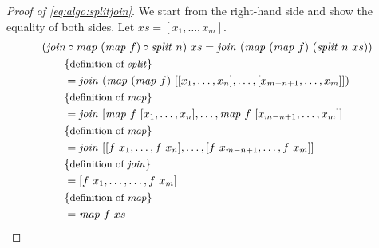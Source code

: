 \begin{proof}[Proof of \autoref{eq:algo:splitjoin}]
  We start from the right-hand side and show the equality of both sides.
  Let $xs = [x_1, \ldots, x_m]$.
  \begin{align*}
    &(\join \circ \map\ (\map\ f) \circ \splitN\ n)\ xs = \join\ (\map\ (\map\ f)\ (\splitN\ n\ xs))\\
    &\qquad \comment{definition of \splitN}\\
    &\qquad = \join\ (\map\ (\map\ f)\ [[x_1, \ldots, x_n], \ldots, [x_{m-n+1}, \ldots, x_m]])\\
    &\qquad \comment{definition of \map}\\
    &\qquad = \join\ [\map\ f\ [x_1, \ldots, x_n], \ldots, \map\ f\ [x_{m-n+1}, \ldots, x_m]]\\
    &\qquad \comment{definition of \map}\\
    &\qquad = \join\ [[f\ x_1, \ldots, f\ x_n], \ldots, [f\ x_{m-n+1}, \ldots, f\ x_m]]\\
    &\qquad \comment{definition of \join}\\
    &\qquad = [f\ x_1, \ldots, \ldots, f\ x_m]\\
    &\qquad \comment{definition of \map}\\
    &\qquad = \map\ f\ xs
  \end{align*}
\end{proof}

